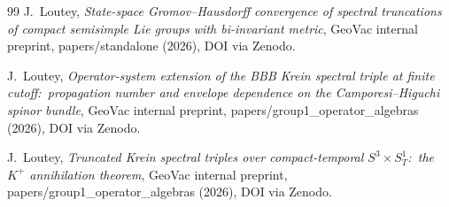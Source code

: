 \documentclass[11pt,a4paper]{article}
\theoremstyle{plain}
\theoremstyle{definition}
\begin{document}
\begin{thebibliography}{99}
J.~Loutey,
\newblock \emph{State-space Gromov--Hausdorff convergence of spectral
truncations of compact semisimple Lie groups with bi-invariant metric},
\newblock GeoVac internal preprint, papers/standalone (2026),
DOI via Zenodo.

J.~Loutey,
\newblock \emph{Operator-system extension of the BBB Krein spectral
triple at finite cutoff:\ propagation number and envelope dependence on
the Camporesi--Higuchi spinor bundle},
\newblock GeoVac internal preprint, papers/group1\_operator\_algebras
(2026), DOI via Zenodo.

J.~Loutey,
\newblock \emph{Truncated Krein spectral triples over compact-temporal
$S^3 \times S^1_T$:\ the $K^{+}$ annihilation theorem},
\newblock GeoVac internal preprint, papers/group1\_operator\_algebras
(2026), DOI via Zenodo.

\end{thebibliography}
\end{document}
